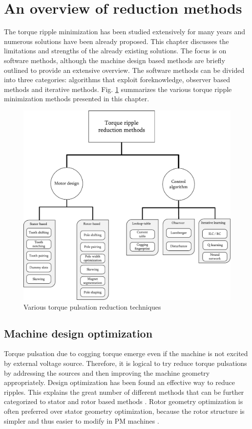 \section{An overview of reduction methods}
The torque ripple minimization has been studied extensively for many years and numerous solutions have been already proposed. This chapter discusses the limitations and strengths of the already existing solutions. The focus is on software methods, although the machine design based methods are briefly outlined to provide an extensive overview. The software methods can be divided into three categories: algorithms that exploit foreknowledge, observer based methods and iterative methods. Fig. \ref{minimization_methods} summarizes the various torque ripple minimization methods presented in this chapter.
\textbf{\textbf{}}\begin{figure}[ht] 
    \centering
    \includegraphics[width=1\linewidth]{images/minimization_methods.pdf} 
    \caption{Various torque pulsation reduction techniques}
    \label{minimization_methods} 
\end{figure}


\subsection{Machine design optimization}
Torque pulsation due to cogging torque emerge even if the machine is not excited by external voltage source. Therefore, it is logical to try reduce torque pulsations by addressing the sources and then improving the machine geometry appropriately. Design optimization has been found an effective way to reduce ripples. This explains the great number of different methods that can be further categorized to stator and rotor based methods \cite{CTR_HW:2013}. Rotor geometry optimization is often preferred over stator geometry optimization, because the rotor structure is simpler and thus easier to modify in PM machines \cite{TRR:1999, CTR_HW:2013}.

